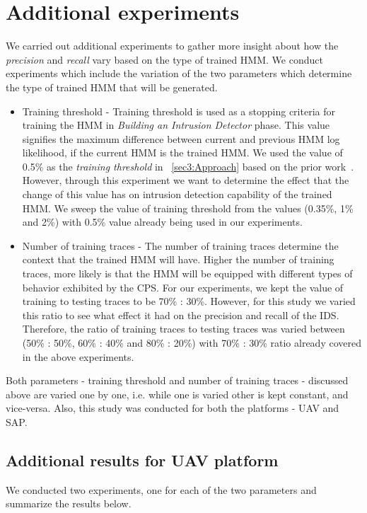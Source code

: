 \section{Additional experiments}
We carried out additional experiments to gather more insight about how the \textit{precision} and \textit{recall} vary based on the type of trained \ac{HMM}.
We conduct experiments which include the variation of the two parameters which determine the type of trained \ac{HMM} that will be generated.
\begin{itemize}
\item Training threshold - Training threshold is used as a stopping criteria for training the \ac{HMM} in \textit{Building an Intrusion Detector} phase. This value signifies the maximum difference between current and previous \ac{HMM} log likelihood, if the current \ac{HMM} is the trained \ac{HMM}. We used the value of 0.5\% as the \textit{training threshold} in ~\autoref{sec3:Approach} based on the prior work~\cite{ferrer2000influence}. However, through this experiment we want to determine the effect that the change of this value has on intrusion detection capability of the trained \ac{HMM}. We sweep the value of training threshold from the values (0.35\%, 1\% and 2\%) with 0.5\% value already being used in our experiments.

\item Number of training traces - The number of training traces determine the context that the trained \ac{HMM} will have. Higher the number of training traces, more likely is that the \ac{HMM} will be equipped with different types of behavior exhibited by the \ac{CPS}. For our experiments, we kept the value of training to testing traces to be 70\% : 30\%. However, for this study we varied this ratio to see what effect it had on the precision and recall of the \ac{IDS}. Therefore, the ratio of training traces to testing traces was varied between (50\% : 50\%, 60\% : 40\% and 80\% : 20\%) with 70\% : 30\% ratio already covered in the above experiments.
\end{itemize}

Both parameters - training threshold and number of training traces - discussed above are varied one by one, i.e. while one is varied other is kept constant, and vice-versa. Also, this study was conducted for both the platforms - \ac{UAV} and \ac{SAP}.

\subsection{Additional results for UAV platform}
We conducted two experiments, one for each of the two parameters and summarize the results below.

